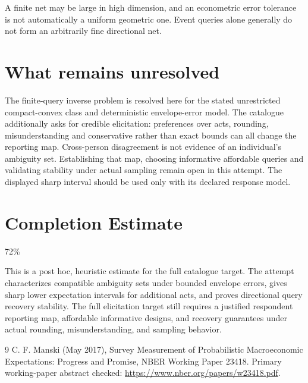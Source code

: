 \documentclass[11pt]{article}
\begin{document}
A finite net may be large in high dimension, and an econometric error tolerance is not automatically a uniform geometric one. Event queries alone generally do not form an arbitrarily fine directional net.

\section*{What remains unresolved}
The finite-query inverse problem is resolved here for the stated unrestricted compact-convex class and deterministic envelope-error model. The catalogue additionally asks for credible elicitation: preferences over acts, rounding, misunderstanding and conservative rather than exact bounds can all change the reporting map. Cross-person disagreement is not evidence of an individual's ambiguity set. Establishing that map, choosing informative affordable queries and validating stability under actual sampling remain open in this attempt. The displayed sharp interval should be used only with its declared response model.

\section{Completion Estimate}
72\%

This is a post hoc, heuristic estimate for the full catalogue target.
The attempt characterizes compatible ambiguity sets under bounded envelope errors, gives sharp lower expectation intervals for additional acts, and proves directional query recovery stability. The full elicitation target still requires a justified respondent reporting map, affordable informative designs, and recovery guarantees under actual rounding, misunderstanding, and sampling behavior.

\begin{thebibliography}{9}
 C. F. Manski (May 2017), Survey Measurement of Probabilistic Macroeconomic Expectations: Progress and Promise, NBER Working Paper 23418. Primary working-paper abstract checked:
\url{https://www.nber.org/papers/w23418.pdf}.
\end{thebibliography}
\end{document}
